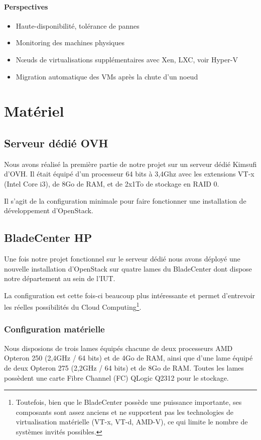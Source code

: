 \documentclass[a4paper,oneside]{report}
\begin{document}
\subsubsection{Perspectives}
\begin{itemize}
\item Haute-disponibilité, tolérance de pannes
\item Monitoring des machines physiques
\item Nœuds de virtualisations supplémentaires avec Xen, LXC, voir Hyper-V
\item Migration automatique des VMs après la chute d'un noeud
\end{itemize}


\chapter{Matériel}

\section{Serveur dédié OVH}
Nous avons réalisé la première partie de notre projet sur un serveur dédié Kimsufi d'OVH.
Il était équipé d'un processeur 64 bits à 3,4Ghz avec les extensions VT-x (Intel Core i3), de 8Go de RAM, et de 2x1To de stockage en RAID 0.

Il s'agit de la configuration minimale pour faire fonctionner une installation de développement d'OpenStack.

\section{BladeCenter HP}
Une fois notre projet fonctionnel sur le serveur dédié nous avons déployé une nouvelle installation d'OpenStack sur quatre lames du BladeCenter dont dispose notre département au sein de l'IUT.

La configuration est cette fois-ci beaucoup plus intéressante et permet d'entrevoir les réelles possibilités du Cloud Computing\footnote{Toutefois, bien que le BladeCenter possède une puissance importante, ses composants sont assez anciens et ne supportent pas les technologies de virtualisation matérielle (VT-x, VT-d, AMD-V), ce qui limite le nombre de systèmes invités possibles.}.

\subsection{Configuration matérielle}
Nous disposions de trois lames équipés chacune de deux processeurs AMD Opteron 250 (2,4GHz / 64 bits) et de 4Go de RAM, ainsi que d'une lame équipé de deux Opteron 275 (2,2GHz / 64 bits) et de 8Go de RAM.\newline
Toutes les lames possèdent une carte Fibre Channel (FC) QLogic Q2312 pour le stockage.
\end{document}

